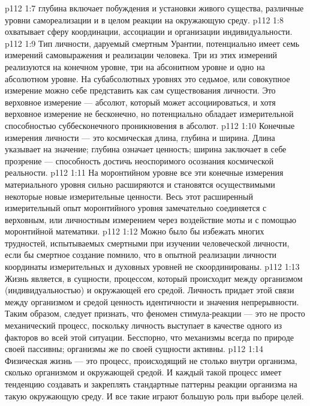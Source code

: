 \vs p112 1:7 \bibnobreakspace {} глубина включает побуждения и установки живого существа, различные уровни самореализации и в целом реакции на окружающую среду.
\vs p112 1:8 \bibnobreakspace {} охватывает сферу координации, ассоциации и организации индивидуальности.
\vs p112 1:9 \pc Тип личности, даруемый смертным Урантии, потенциально имеет семь измерений самовыражения и реализации человека. Три из этих измерений реализуются на конечном уровне, три на абсонитном уровне и одно на абсолютном уровне. На субабсолютных уровнях это седьмое, или совокупное измерение можно себе представить как сам  существования личности. Это верховное измерение --- абсолют, который может ассоциироваться, и хотя верховное измерение не бесконечно, но потенциально обладает измерительной способностью суббесконечного проникновения в абсолют.
\vs p112 1:10 Конечные измерения личности --- это космическая длина, глубина и ширина. Длина указывает на значение; глубина означает ценность; ширина заключает в себе прозрение --- способность достичь неоспоримого осознания космической реальности.
\vs p112 1:11 На моронтийном уровне все эти конечные измерения материального уровня сильно расширяются и становятся осуществимыми некоторые новые измерительные ценности. Весь этот расширенный измерительный опыт моронтийного уровня замечательно соединяется с верховным, или личностным измерением через воздействие моты и с помощью моронтийной математики.
\vs p112 1:12 Можно было бы избежать многих трудностей, испытываемых смертными при изучении человеческой личности, если бы смертное создание помнило, что в опытной реализации личности координаты измерительных и духовных уровней не скоординированы.
\vs p112 1:13 \pc Жизнь является, в сущности, процессом, который происходит между организмом (индивидуальностью) и окружающей его средой. Личность придает этой связи между организмом и средой ценность идентичности и значения непрерывности. Таким образом, следует признать, что феномен стимула\hyp{}реакции --- это не просто механический процесс, поскольку личность выступает в качестве одного из факторов во всей этой ситуации. Бесспорно, что механизмы всегда по природе своей пассивны; организмы же по своей сущности активны.
\vs p112 1:14 Физическая жизнь --- это процесс, происходящий не столько внутри организма, сколько  организмом и окружающей средой. И каждый такой процесс имеет тенденцию создавать и закреплять стандартные паттерны реакции организма на такую окружающую среду. И все такие  играют большую роль при выборе целей.
